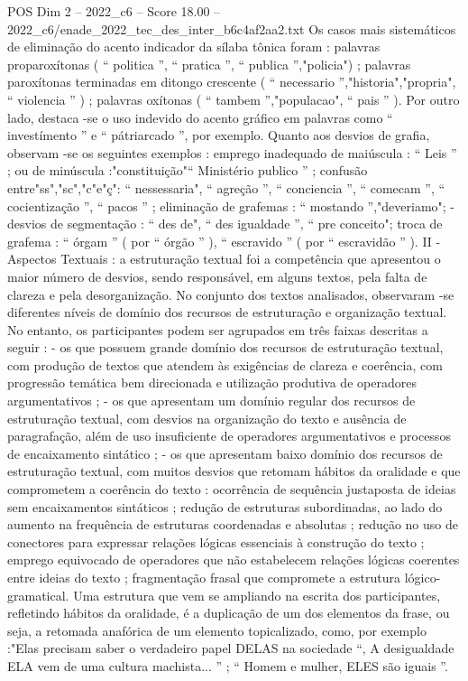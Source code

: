 \begin{textsample}{POS Dim 2 – 2022\_c6 – Score 18.00 – 2022\_c6/enade\_2022\_tec\_des\_inter\_b6c4af2aa2.txt}
Os casos mais sistemáticos de eliminação do acento indicador da sílaba tônica foram : palavras proparoxítonas ( “ politica ”, “ pratica ”, “ publica ”,"policia") ; palavras paroxítonas terminadas em ditongo crescente ( “ necessario ”,"historia","propria", “ violencia ” ) ; palavras oxítonas ( “ tambem ”,"populacao", “ pais ” ).
Por outro lado, destaca -se o uso indevido do acento gráfico em palavras como “ investímento ” e “ pátriarcado ”, por exemplo.
Quanto aos desvios de grafia, observam -se os seguintes exemplos : emprego inadequado de maiúscula : “ Leis ” ; ou de minúscula :"constituição"“ Ministério publico ” ; confusão entre"ss","sc","c"e"ç": “ nessessaria", “ agreção ”, “ conciencia ”, “ comecam ”, “ cocientização ”, “ pacos ” ; eliminação de grafemas : “ mostando ”,"deveriamo"; - desvios de segmentação : “ des de", “ des igualdade ”, “ pre conceito"; troca de grafema : “ órgam ” ( por “ órgão ” ), “ escravido ” ( por “ escravidão ” ).
II - Aspectos Textuais : a estruturação textual foi a competência que apresentou o maior número de desvios, sendo responsável, em alguns textos, pela falta de clareza e pela desorganização.
No conjunto dos textos analisados, observaram -se diferentes níveis de domínio dos recursos de estruturação e organização textual.
No entanto, os participantes podem ser agrupados em três faixas descritas a seguir : - os que possuem grande domínio dos recursos de estruturação textual, com produção de textos que atendem às exigências de clareza e coerência, com progressão temática bem direcionada e utilização produtiva de operadores argumentativos ; - os que apresentam um domínio regular dos recursos de estruturação textual, com desvios na organização do texto e ausência de paragrafação, além de uso insuficiente de operadores argumentativos e processos de encaixamento sintático ; - os que apresentam baixo domínio dos recursos de estruturação textual, com muitos desvios que retomam hábitos da oralidade e que comprometem a coerência do texto : ocorrência de sequência justaposta de ideias sem encaixamentos sintáticos ; redução de estruturas subordinadas, ao lado do aumento na frequência de estruturas coordenadas e absolutas ; redução no uso de conectores para expressar relações lógicas essenciais à construção do texto ; emprego equivocado de operadores que não estabelecem relações lógicas coerentes entre ideias do texto ; fragmentação frasal que compromete a estrutura lógico-gramatical.
Uma estrutura que vem se ampliando na escrita dos participantes, refletindo hábitos da oralidade, é a duplicação de um dos elementos da frase, ou seja, a retomada anafórica de um elemento topicalizado, como, por exemplo :"Elas precisam saber o verdadeiro papel DELAS na sociedade “, A desigualdade ELA vem de uma cultura machista... ” ; “ Homem e mulher, ELES são iguais ”.

\end{textsample}
